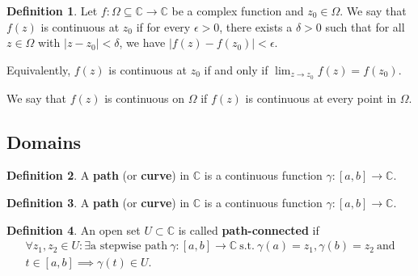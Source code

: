 \documentclass[12pt,openany]{book}
\theoremstyle{definition}
\newtheorem{definition}{Definition}[chapter]
\newcommand{\C}{\mathbb{C}}
\begin{document}
	\begin{tcolorbox}[colback=white,colframe=defcolor,arc=5pt,title={\color{white}\bf Continuity of Complex function}]
		\begin{definition}
			Let $f: \Omega \subseteq \mathbb{C} \rightarrow \mathbb{C}$ be a complex function and $z_0 \in \Omega$. We say that $f(z)$ is continuous at $z_0$ if for every $\epsilon > 0$, there exists a $\delta > 0$ such that for all $z \in \Omega$ with $|z - z_0| < \delta$, we have $|f(z) - f(z_0)| < \epsilon$.
			
			Equivalently, $f(z)$ is continuous at $z_0$ if and only if $\lim_{z \to z_0} f(z) = f(z_0)$.
			
			We say that $f(z)$ is continuous on $\Omega$ if $f(z)$ is continuous at every point in $\Omega$.
		\end{definition}
	\end{tcolorbox}
	
	\subsection{Domains}
	\begin{tcolorbox}[title=Path; Curve; Contour;]
		\begin{definition}
			A \textbf{path} (or \textbf{curve}) in $\C$ is a continuous function $\gamma:[a,b]\to\C$.
		\end{definition}
	\end{tcolorbox}
	
	\begin{tcolorbox}[title=Stepwise Path;]
		\begin{definition}
			A \textbf{path} (or \textbf{curve}) in $\C$ is a continuous function $\gamma:[a,b]\to\C$.
		\end{definition}
	\end{tcolorbox}
	
	\begin{tcolorbox}[title=Path-connected;]
		\begin{definition}
			An open set $U\subset\C$ is called \textbf{path-connected} if \begin{align*}
			\forall z_1,z_2\in U:\exists\text{a stepwise path}\ \gamma:[a,b]\to\C\ \text{s.t.}\ \gamma(a)=z_1,\gamma(b)=z_2\ \text{and}\\
			t\in[a,b]\implies\gamma(t)\in U.
			\end{align*}
		\end{definition}
	\end{tcolorbox}
	\fi
	
\end{document}
